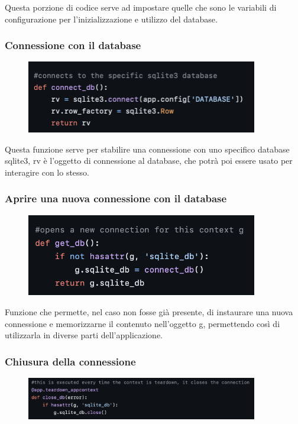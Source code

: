 \documentclass{article}
\begin{document}
Questa porzione di codice serve ad impostare quelle che sono le variabili di configurazione per l’inizializzazione e utilizzo del database.

\subsubsection{Connessione con il database}
\begin{figure}[H]
    \centering
    \includegraphics[width=0.9\textwidth]{images/connessione_db.png}
\end{figure}

Questa funzione serve per stabilire una connessione con uno specifico database sqlite3, rv è l’oggetto di connessione al database, che potrà poi essere usato per interagire con lo stesso.

\subsubsection{Aprire una nuova connessione con il database}
\begin{figure}[H]
    \centering
    \includegraphics[width=0.9\textwidth]{images/apertura_connessione_db.png}
\end{figure}

Funzione che permette, nel caso non fosse già presente, di instaurare una nuova connessione e memorizzarne il contenuto nell’oggetto g, permettendo così di utilizzarla in diverse parti dell’applicazione.

\subsubsection{Chiusura della connessione}
\begin{figure}[H]
    \centering
    \includegraphics[width=0.9\textwidth]{images/chiusura_connessione_db.png}
\end{figure}
\end{document}
